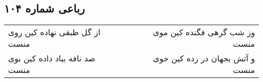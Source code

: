 \begin{center}
\section*{رباعی شماره ۱۰۴}
\label{sec:sh104}
\begin{longtable}{l p{0.5cm} r}
از گل طبقی نهاده کین روی منست
&&
وز شب گرهی فگنده کین موی منست
\\
صد نافه بباد داده کین بوی منست
&&
و آتش بجهان در زده کین خوی منست
\\
\end{longtable}
\end{center}
